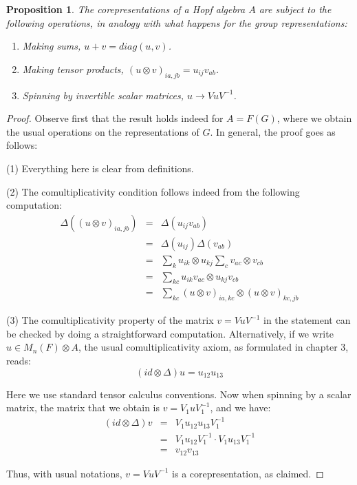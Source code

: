 \documentclass[12pt]{amsbook}
\newtheorem{proposition}[theorem]{Proposition}
\begin{document}

\begin{proposition}
The corepresentations of a Hopf algebra $A$ are subject to the following operations, in analogy with what happens for the group representations:
\begin{enumerate}
\item Making sums, $u+v=diag(u,v)$.

\item Making tensor products, $(u\otimes v)_{ia,jb}=u_{ij}v_{ab}$.

\item Spinning by invertible scalar matrices, $u\to VuV^{-1}$.
\end{enumerate}
\end{proposition}

\begin{proof}
Observe first that the result holds indeed for $A=F(G)$, where we obtain the usual operations on the representations of $G$. In general, the proof goes as follows:

\medskip

(1) Everything here is clear from definitions.

\medskip

(2) The comultiplicativity condition follows indeed from the following computation: 
\begin{eqnarray*}
\Delta((u\otimes v)_{ia,jb})
&=&\Delta(u_{ij}v_{ab})\\
&=&\Delta(u_{ij})\Delta(v_{ab})\\
&=&\sum_ku_{ik}\otimes u_{kj}\sum_cv_{ac}\otimes v_{cb}\\
&=&\sum_{kc}u_{ik}v_{ac}\otimes u_{kj}v_{cb}\\
&=&\sum_{kc}(u\otimes v)_{ia,kc}\otimes(u\otimes v)_{kc,jb}
\end{eqnarray*}

(3) The comultiplicativity property of the matrix $v=VuV^{-1}$ in the statement can be checked by doing a straightforward computation. Alternatively, if we write $u\in M_n(F)\otimes A$, the usual comultiplicativity axiom, as formulated in chapter 3, reads:
$$(id\otimes\Delta)u=u_{12}u_{13}$$

Here we use standard tensor calculus conventions. Now when spinning by a scalar matrix, the matrix that we obtain is $v=V_1uV_1^{-1}$, and we have:
\begin{eqnarray*}
(id\otimes\Delta)v
&=&V_1u_{12}u_{13}V_1^{-1}\\
&=&V_1u_{12}V_1^{-1}\cdot V_1u_{13}V_1^{-1}\\
&=&v_{12}v_{13}
\end{eqnarray*}

Thus, with usual notations, $v=VuV^{-1}$ is a corepresentation, as claimed.
\end{proof}
\end{document}
